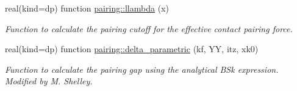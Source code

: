 \begin{DoxyCompactItemize}
real(kind=dp) function \mbox{\hyperlink{namespacepairing_ab022f3dcf7994e9f95315b3b2007a9ee}{pairing\+::llambda}} (x)
\begin{DoxyCompactList}\small\item\em Function to calculate the pairing cutoff for the effective contact pairing force. \end{DoxyCompactList}\item 
real(kind=dp) function \mbox{\hyperlink{namespacepairing_aaa0b619b1e454229caef01a56d0a61fd}{pairing\+::delta\+\_\+parametric}} (kf, YY, itz, xk0)
\begin{DoxyCompactList}\small\item\em Function to calculate the pairing gap using the analytical B\+Sk expression. Modified by M. Shelley. \end{DoxyCompactList}\end{DoxyCompactItemize}

